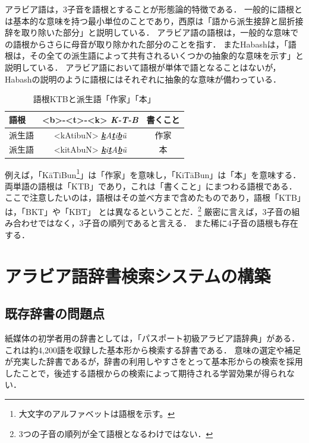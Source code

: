 \documentclass[technicalreport]{ieicej}
\begin{document}
アラビア語は，3子音を語根とすることが形態論的特徴である．
一般的に語根とは基本的な意味を持つ最小単位のことであり，西原\cite{nishihara2012}は「語から派生接辞と屈折接辞を取り除いた部分」と説明している．
アラビア語の語根は，一般的な意味での語根からさらに母音が取り除かれた部分のことを指す．
またHabash\cite{habash2010}は，「語根は，その全ての派生語によって共有されるいくつかの抽象的な意味を示す」と説明している．
アラビア語において語根が単体で語となることはないが，Habashの説明のように語根にはそれぞれに抽象的な意味が備わっている．

\begin{table}[ht]
\begin{center}
\begin{tabular}{l|cc}
   語根& <b>-<t>-<k> \textit{\textbf{K-T-B}} & 書くこと\\
  \hline
 派生語& <kAtibuN> \textit{\underline{\textbf{k}}A\underline{\textbf{t}}i\underline{\textbf{b}}\~u} & 作家\\
  派生語& <kitAbuN> \textit{\underline{\textbf{k}}i\underline{\textbf{t}}A\underline{\textbf{b}}\~u} & 本\\
\hline
\end{tabular}
\caption{語根KTBと派生語「作家」「本」}
\label{table:alignment}
\end{center}
\end{table}

例えば，「K\=aTiBun\footnote{大文字のアルファベットは語根を示す。}」は「作家」を意味し，「KiT\=aBun」は「本」を意味する．
両単語の語根は「KTB」であり，これは「書くこと」にまつわる語根である．
ここで注意したいのは，語根はその並べ方まで含めたものであり，語根「KTB」は，「BKT」や「KBT」 とは異なるということだ．\footnote{3つの子音の順列が全て語根となるわけではない．}
厳密に言えば，3子音の組み合わせではなく，3子音の順列であると言える．
また稀に4子音の語根も存在する．

\section{アラビア語辞書検索システムの構築}
\subsection{既存辞書の問題点}
紙媒体の初学者用の辞書としては，「パスポート初級アラビア語辞典」がある．
これは約4,200語を収録した基本形から検索する辞書である．
意味の選定や補足が充実した辞書であるが，辞書の利用しやすさをとって基本形からの検索を採用したことで，後述する語根からの検索によって期待される学習効果が得られない．
\end{document}
